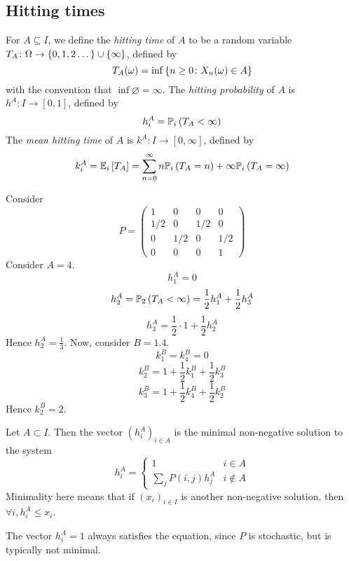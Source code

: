 \subsection{Hitting times}
\begin{definition}
	For \( A \subseteq I \), we define the \textit{hitting time} of \( A \) to be a random variable \( T_A \colon \Omega \to \qty{0,1,2\dots} \cup \{ \infty \} \), defined by
	\[
		T_A(\omega) = \inf \qty{n \geq 0 \colon X_n(\omega) \in A}
	\]
	with the convention that \( \inf \varnothing = \infty \).
	The \textit{hitting probability} of \( A \) is \( h^A \colon I \to [0,1] \), defined by
	\[
		h_i^A = \mathbb{P}_{i}\left({T_A < \infty}\right)
	\]
	The \textit{mean hitting time} of \( A \) is \( k^A \colon I \to [0,\infty] \), defined by
	\[
		k_i^A = \mathbb{E}_{i}\left[{T_A}\right] = \sum_{n=0}^\infty n \mathbb{P}_{i}\left({T_A = n}\right) + \infty \mathbb{P}_{i}\left({T_A = \infty}\right)
	\]
\end{definition}
\begin{example}
	Consider
	\[
		P = \begin{pmatrix}
			1   & 0   & 0   & 0   \\
			1/2 & 0   & 1/2 & 0   \\
			0   & 1/2 & 0   & 1/2 \\
			0   & 0   & 0   & 1
		\end{pmatrix}
	\]
	Consider \( A = \qty{4} \).
	\[
		h_1^A = 0
	\]
	\[
		h_2^A = \mathbb{P}_{2}\left({T_A < \infty}\right) = \frac{1}{2} h_1^A + \frac{1}{2} h_3^A
	\]
	\[
		h_3^A = \frac{1}{2} \cdot 1 + \frac{1}{2} h_2^A
	\]
	Hence \( h_2^A = \frac{1}{3} \).
	Now, consider \( B = \qty{1,4} \).
	\[
		k_1^B = k_4^B = 0
	\]
	\[
		k_2^B = 1 + \frac{1}{2} k_1^B + \frac{1}{2} k_3^B
	\]
	\[
		k_3^B = 1 + \frac{1}{2} k_4^B + \frac{1}{2} k_2^B
	\]
	Hence \( k_2^B = 2 \).
\end{example}
\begin{theorem}
	Let \( A \subset I \).
	Then the vector \( (h_i^A)_{i \in A} \) is the minimal non-negative solution to the system
	\[
		h_i^A = \begin{cases}
			1                   & i \in A     \\
			\sum_j P(i,j) h_j^A & i \not\in A\end{cases}
	\]
	Minimality here means that if \( (x_i)_{i \in I} \) is another non-negative solution, then \( \forall i, h_i^A \leq x_i \).
\end{theorem}
\begin{note}
	The vector \( h_i^A = 1 \) always satisfies the equation, since \( P \) is stochastic, but is typically not minimal.
\end{note}
